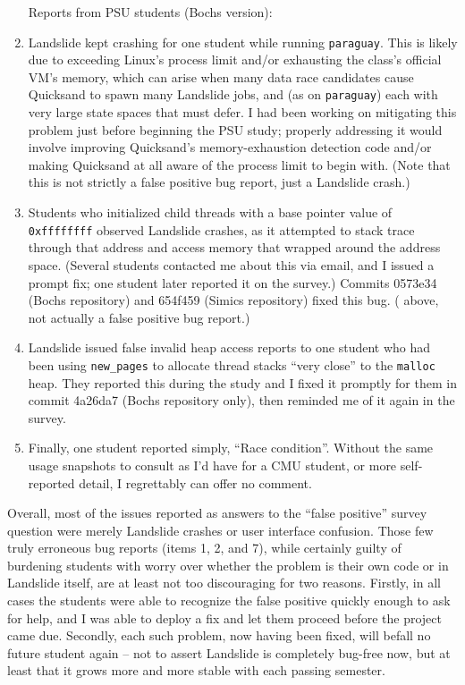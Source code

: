 \begin{enumerate}
Reports from PSU students (Bochs version):
	\item Landslide kept crashing for one student while running {\tt paraguay}.
		This is likely due to exceeding Linux's process limit and/or exhausting the class's official VM's memory,
		which can arise when many data race candidates cause Quicksand to spawn many Landslide jobs,
		and (as on {\tt paraguay}) each with very large state spaces that must defer.
		I had been working on mitigating this problem just before beginning the PSU study;
		properly addressing it would involve improving Quicksand's memory-exhaustion detection code
		and/or making Quicksand at all aware of the process limit to begin with.
		(Note that this is not strictly a false positive bug report, just a Landslide crash.)
	\item Students who initialized child threads with a base pointer value of {\tt 0xffffffff} observed Landslide crashes,
		as it attempted to stack trace through that address and access memory that wrapped around the address space.
		(Several students contacted me about this via email, and I issued a prompt fix;
		one student later reported it on the survey.)
		Commits 0573e34 (Bochs repository) and 654f459 (Simics repository) fixed this bug.
		( above, not actually a false positive bug report.)
	\item Landslide issued false invalid heap access reports to one student
		who had been using {\tt new\_pages} to allocate thread stacks ``very close'' to the {\tt malloc} heap.
		They reported this during the study and I fixed it promptly for them in commit 4a26da7 (Bochs repository only),
		then reminded me of it again in the survey.
	\item Finally, one student reported simply, ``Race condition''.
		Without the same usage snapshots to consult as I'd have for a CMU student,
		or more self-reported detail, I regrettably can offer no comment.
\end{enumerate}

\noindent
Overall, most of the issues reported as answers to the ``false positive'' survey question
were merely Landslide crashes or user interface confusion.
Those few truly erroneous bug reports (items 1, 2, and 7),
while certainly guilty of burdening %
students with worry over whether the problem is their own code or in Landslide itself,
are at least not too discouraging for two reasons.
Firstly, in all cases the students were able to recognize the false positive quickly enough to ask for help,
and I was able to deploy a fix and let them proceed before the project came due.
Secondly, each such problem, now having been fixed, will befall no future student again --
not to assert Landslide is completely bug-free now,
but at least that it grows more and more stable with each passing semester.

